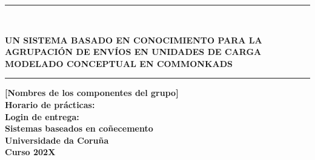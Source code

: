 \documentclass[12pt,a4paper,twoside,spanish]{article}      %
\begin{document}
\def\chaptername{Capítulo}
\def\tablename{Tabla}
\def\listtablename{Índice de Tablas}
\chapterfont{\LARGE\raggedleft}

\pagestyle{empty}

\begin{titlepage}
\setlength{\parindent}{0cm} \setlength{\parskip}{0cm}


\newcommand{\HRule}{\rule{\linewidth}{1mm}}

\vspace*{2cm}
\HRule \\[0.5cm]
\begin{center}
\textsf{\textbf{\large UN SISTEMA BASADO EN CONOCIMIENTO PARA LA AGRUPACIÓN DE ENVÍOS EN UNIDADES DE CARGA\\[0.75cm] MODELADO CONCEPTUAL EN COMMONKADS \\[0.5cm]}}
\HRule \vspace*{3cm}

\textsf{\textbf{\normalsize [Nombres de los componentes del
grupo]\\[5cm]
Horario de prácticas:\\
Login de entrega: \\[2.5cm]
Sistemas baseados en coñecemento\\
Universidade da Coruña \\ Curso
202X}}
\end{center}
\end{titlepage}

\cleardoublepage


\tableofcontents
\cleardoublepage


\end{document}
